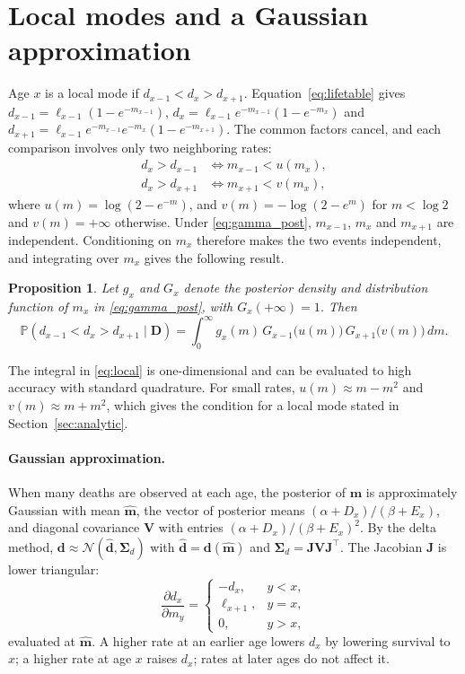 \documentclass[12pt, letterpaper]{article}
\newtheorem{proposition}{Proposition}
\begin{document}
\section{Local modes and a Gaussian approximation}
\label{app:analytic}

Age $x$ is a local mode if $d_{x-1} < d_x > d_{x+1}$. Equation~\eqref{eq:lifetable} gives $d_{x-1} = \ell_{x-1}(1 - e^{-m_{x-1}})$, $d_x = \ell_{x-1} e^{-m_{x-1}}(1 - e^{-m_x})$ and $d_{x+1} = \ell_{x-1} e^{-m_{x-1}} e^{-m_x} (1 - e^{-m_{x+1}})$. The common factors cancel, and each comparison involves only two neighboring rates:
\begin{align}
d_x > d_{x-1} &\iff m_{x-1} < u(m_x), \label{eq:left}\\
d_x > d_{x+1} &\iff m_{x+1} < v(m_x), \label{eq:right}
\end{align}
where $u(m) = \log(2 - e^{-m})$, and $v(m) = -\log(2 - e^{m})$ for $m < \log 2$ and $v(m) = +\infty$ otherwise. Under \eqref{eq:gamma_post}, $m_{x-1}$, $m_x$ and $m_{x+1}$ are independent. Conditioning on $m_x$ therefore makes the two events independent, and integrating over $m_x$ gives the following result.

\begin{proposition}
\label{prop:local}
Let $g_x$ and $G_x$ denote the posterior density and distribution function of $m_x$ in \eqref{eq:gamma_post}, with $G_x(+\infty) = 1$. Then
\begin{equation}
\mathbb{P}(d_{x-1} < d_x > d_{x+1} \mid \bm{D}) 
 = \int_0^\infty g_x(m)\, G_{x-1}\big(u(m)\big)\, G_{x+1}\big(v(m)\big)\, dm .
\label{eq:local}
\end{equation}
\end{proposition}

The integral in \eqref{eq:local} is one-dimensional and can be evaluated to high accuracy with standard quadrature. For small rates, $u(m) \approx m - m^2$ and $v(m) \approx m + m^2$, which gives the condition for a local mode stated in Section~\ref{sec:analytic}.

\paragraph{Gaussian approximation.} When many deaths are observed at each age, the posterior of $\bm{m}$ is approximately Gaussian with mean $\hat{\bm{m}}$, the vector of posterior means $(\alpha + D_x)/(\beta + E_x)$, and diagonal covariance $\bm{V}$ with entries $(\alpha + D_x)/(\beta + E_x)^2$. By the delta method, $\bm{d} \approx \mathcal{N}(\hat{\bm{d}}, \bm{\Sigma}_d)$ with $\hat{\bm{d}} = \bm{d}(\hat{\bm{m}})$ and $\bm{\Sigma}_d = \bm{J} \bm{V} \bm{J}^\top$. The Jacobian $\bm{J}$ is lower triangular:
\begin{equation}
\frac{\partial d_x}{\partial m_y} =
\begin{cases}
-d_x, & y < x,\\
\ell_{x+1}, & y = x,\\
0, & y > x,
\end{cases}
\label{eq:jacobian}
\end{equation}
evaluated at $\hat{\bm{m}}$. A higher rate at an earlier age lowers $d_x$ by lowering survival to $x$; a higher rate at age $x$ raises $d_x$; rates at later ages do not affect it.
\end{document}
